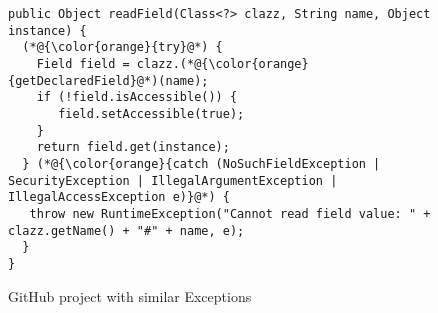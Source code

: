 \begin{figure}[htbp]
	\centering
\begin{lstlisting}[]
public Object readField(Class<?> clazz, String name, Object instance) {
  (*@{\color{orange}{try}@*) {
    Field field = clazz.(*@{\color{orange}{getDeclaredField}@*)(name);
    if (!field.isAccessible()) {
       field.setAccessible(true);
    }
    return field.get(instance);
  } (*@{\color{orange}{catch (NoSuchFieldException | SecurityException | IllegalArgumentException | IllegalAccessException e)}@*) {
   throw new RuntimeException("Cannot read field value: " + clazz.getName() + "#" + name, e);
  }
}
\end{lstlisting}
        \vspace{-12pt}
        \caption{GitHub project  with similar Exceptions}
        \label{fig:example3}
\end{figure}

